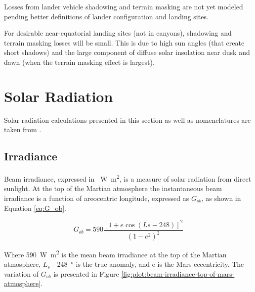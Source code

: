Losses from lander vehicle shadowing and terrain masking are not yet modeled pending better definitions of lander configuration and landing sites. 

For desirable near-equatorial landing sites (not in canyons), shadowing and terrain masking losses will be small. This is due to high sun angles (that create short shadows) and the large component of diffuse solar insolation near dusk and dawn (when the terrain masking effect is largest). 

\section{Solar Radiation}
\label{sec:MartianEnvironment:SolarRadiation}
%

Solar radiation calculations presented in this section as well as nomenclatures are taken from .

\subsection{Irradiance}

Beam irradiance, expressed in \SI{}{\watt\meter\squared}, is a measure of solar radiation from direct sunlight. At the top of the Martian atmosphere the instantaneous beam irradiance is a function of areocentric longitude, expressed as $G_{ob}$, as shown in Equation \ref{eq:G_ob}.

\begin{equation}
  \label{eq:G_ob}
  G_{ob} = 590 \frac{[1 + e \cos{(Ls - 248)}]^2}{(1-e^2)^2}
\end{equation}

Where \SI{590}{\watt\meter\squared} is the mean beam irradiance at the top of the Martian atmosphere, $L_{s}$ - \SI{248}{\degree} is the true anomaly, and e is the Mars eccentricity. The variation of $G_{ob}$ is presented in Figure \ref{fig:plot:beam-irradiance-top-of-mars-atmosphere}.

